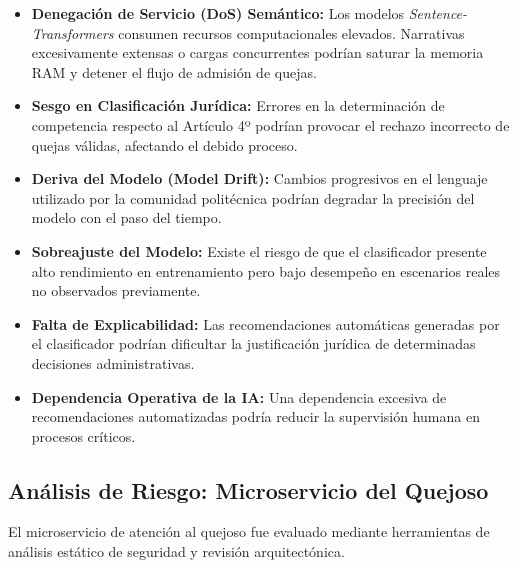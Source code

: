 \documentclass[12pt,oneside,letterpaper]{book}
\begin{document}
\begin{itemize}

\item \textbf{Denegación de Servicio (DoS) Semántico:}
Los modelos \textit{Sentence-Transformers} consumen recursos computacionales elevados. Narrativas excesivamente extensas o cargas concurrentes podrían saturar la memoria RAM y detener el flujo de admisión de quejas.

\item \textbf{Sesgo en Clasificación Jurídica:}
Errores en la determinación de competencia respecto al Artículo 4º podrían provocar el rechazo incorrecto de quejas válidas, afectando el debido proceso.

\item \textbf{Deriva del Modelo (Model Drift):}
Cambios progresivos en el lenguaje utilizado por la comunidad politécnica podrían degradar la precisión del modelo con el paso del tiempo.

\item \textbf{Sobreajuste del Modelo:}
Existe el riesgo de que el clasificador presente alto rendimiento en entrenamiento pero bajo desempeño en escenarios reales no observados previamente.

\item \textbf{Falta de Explicabilidad:}
Las recomendaciones automáticas generadas por el clasificador podrían dificultar la justificación jurídica de determinadas decisiones administrativas.

\item \textbf{Dependencia Operativa de la IA:}
Una dependencia excesiva de recomendaciones automatizadas podría reducir la supervisión humana en procesos críticos.

\end{itemize}


\subsection{Análisis de Riesgo: Microservicio del Quejoso}

El microservicio de atención al quejoso fue evaluado mediante herramientas de análisis estático de seguridad y revisión arquitectónica.
\end{document}
